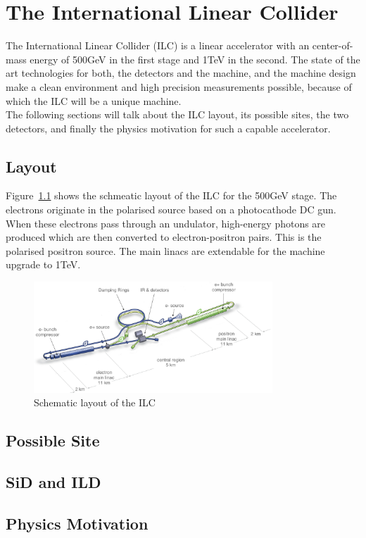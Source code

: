 \chapter{The International Linear Collider}
\label{ILC}
The International Linear Collider (ILC) is a linear \electron \positron accelerator with an center-of-mass energy of \unit{500}{GeV} in the first stage and \unit{1}{TeV} in the second.
The state of the art technologies for both, the detectors and the machine, and the machine design make a clean environment and high precision measurements possible, because of which the ILC will be a unique machine.\\
The following sections will talk about the ILC layout, its possible sites, the two detectors, and finally the physics motivation for such a capable accelerator.
\section{Layout}
\label{ILC:layout}

Figure~\ref{fig:ILC_Layout} shows the schmeatic layout of the ILC for the \unit{500}{GeV} stage.
The electrons originate in the polarised source based on a photocathode DC gun.
When these electrons pass through an undulator, high-energy photons are produced which are then converted to electron-positron pairs.
This is the polarised positron source.
The main linacs are extendable for the machine upgrade to \unit{1}{TeV}.

\begin{figure}
\centering
\includegraphics[width=0.8\textwidth]{Figures/ILC_layout.png}
\caption[Schematic layout of the ILC]{Schematic layout of the ILC~\cite[p. 9]{ILC1}}
\label{fig:ILC_Layout}
\end{figure}


\section{Possible Site}
\label{ILC:site}
\section{SiD and ILD}
\label{ILC:detectors}
\section{Physics Motivation}
\label{ILC:physicsmotivation}
